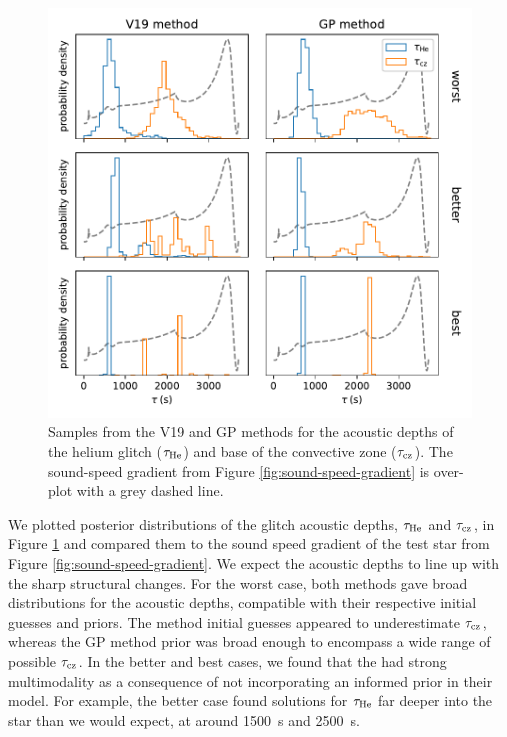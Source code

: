 \begin{figure}[!tbp]
    \centering
    \includegraphics{figures/glitch-test-tau.pdf}
    \caption{Samples from the V19 and GP methods for the acoustic depths of the helium glitch (\(\tau_{{\mathrm{He}}}\)) and base of the convective zone (\(\tau_{{\mathrm{cz}}}\)). The sound-speed gradient from Figure \ref{fig:sound-speed-gradient} is over-plot with a grey dashed line.}
    \label{fig:glitch-test-tau}
\end{figure}

We plotted posterior distributions of the glitch acoustic depths, \(\tau_{{\mathrm{He}}}\) and \(\tau_{{\mathrm{cz}}}\), in Figure \ref{fig:glitch-test-tau} and compared them to the sound speed gradient of the test star from Figure \ref{fig:sound-speed-gradient}. We expect the acoustic depths to line up with the sharp structural changes. For the worst case, both methods gave broad distributions for the acoustic depths, compatible with their respective initial guesses and priors. The  method initial guesses appeared to underestimate \(\tau_{{\mathrm{cz}}}\), whereas the GP method prior was broad enough to encompass a wide range of possible \(\tau_{{\mathrm{cz}}}\). In the better and best cases, we found that the  had strong multimodality as a consequence of not incorporating an informed prior in their model. For example, the better case found solutions for \(\tau_{{\mathrm{He}}}\) far deeper into the star than we would expect, at around \SI{1500}{\second} and \SI{2500}{\second}. 

